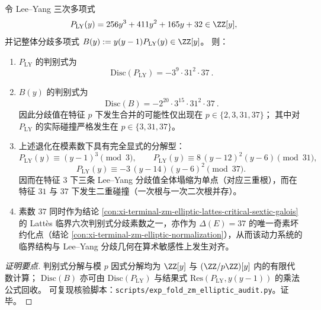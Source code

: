 \begin{conclusion}\label{con:xi-terminal-zm-leyang-branchpolynomial-discriminant-modp-collisions}
令 Lee--Yang 三次多项式
\[
P_{\mathrm{LY}}(y)=256y^3+411y^2+165y+32\in\ZZ[y],
\]
并记整体分歧多项式
\(
B(y):=y(y-1)P_{\mathrm{LY}}(y)\in\ZZ[y]
\)。
则：
\begin{enumerate}
  \item \(P_{\mathrm{LY}}\) 的判别式为
  \[
  \boxed{\ \mathrm{Disc}(P_{\mathrm{LY}})=-3^9\cdot 31^2\cdot 37\ }.
  \]
  \item \(B(y)\) 的判别式为
  \[
  \boxed{\ \mathrm{Disc}(B)=-2^{20}\cdot 3^{15}\cdot 31^2\cdot 37\ }.
  \]
  因此分歧值在特征 \(p\) 下发生合并的可能性仅出现在 \(p\in\{2,3,31,37\}\)；
  其中对 \(P_{\mathrm{LY}}\) 的实际碰撞严格发生在 \(p\in\{3,31,37\}\)。
  \item 上述退化在模素数下具有完全显式的分解型：
  \[
  P_{\mathrm{LY}}(y)\equiv (y-1)^3 \pmod 3,\qquad
  P_{\mathrm{LY}}(y)\equiv 8\,(y-12)^2(y-6)\pmod{31},
  \]
  \[
  P_{\mathrm{LY}}(y)\equiv -3\,(y-14)(y-6)^2\pmod{37}.
  \]
  因而在特征 \(3\) 下三条 Lee--Yang 分歧值全体塌缩为单点（对应三重根），而在特征 \(31\) 与 \(37\) 下发生二重碰撞（一次根与一次二次根并存）。
  \item 素数 \(37\) 同时作为结论 \ref{con:xi-terminal-zm-elliptic-lattes-critical-sextic-galois} 的 Latt\`es 临界六次判别式分歧素数之一，亦作为 \(\Delta(E)=37\) 的唯一奇素坏约化点（结论 \ref{con:xi-terminal-zm-elliptic-normalization}），从而该动力系统的临界结构与 Lee--Yang 分歧几何在算术敏感性上发生对齐。
\end{enumerate}
\end{conclusion}
\begin{proof}[证明要点]
判别式分解与模 \(p\) 因式分解均为 \(\ZZ[y]\) 与 \((\ZZ/p\ZZ)[y]\) 内的有限代数计算；
\(\mathrm{Disc}(B)\) 亦可由 \(\mathrm{Disc}(P_{\mathrm{LY}})\) 与结果式 \(\mathrm{Res}(P_{\mathrm{LY}},y(y-1))\) 的乘法公式回收。
可复现核验脚本：\texttt{scripts/exp\_fold\_zm\_elliptic\_audit.py}。证毕。
\end{proof}

